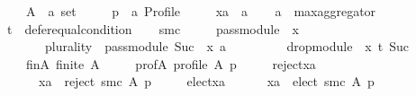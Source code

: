 \begin{isabellebody}
\isanewline
\ \ \ \ A\ {\isacharcolon}{\kern0pt}{\isacharcolon}{\kern0pt}\ {\isachardoublequoteopen}{\isacharprime}{\kern0pt}a\ set{\isachardoublequoteclose}\ \isanewline
\ \ \ \ p\ {\isacharcolon}{\kern0pt}{\isacharcolon}{\kern0pt}\ {\isachardoublequoteopen}{\isacharprime}{\kern0pt}a\ Profile{\isachardoublequoteclose}\ \isanewline
\ \ \ \ xa\ {\isacharcolon}{\kern0pt}{\isacharcolon}{\kern0pt}\ {\isachardoublequoteopen}{\isacharprime}{\kern0pt}a{\isachardoublequoteclose}\isanewline
\ \ \isamarkupfalse%
\ {\isacharquery}{\kern0pt}a\ {\isacharequal}{\kern0pt}\ {\isachardoublequoteopen}max{\isacharunderscore}{\kern0pt}aggregator{\isachardoublequoteclose}\isanewline
\ \ \isamarkupfalse%
\ {\isacharquery}{\kern0pt}t\ {\isacharequal}{\kern0pt}\ {\isachardoublequoteopen}defer{\isacharunderscore}{\kern0pt}equal{\isacharunderscore}{\kern0pt}condition{\isachardoublequoteclose}\isanewline
\ \ \isamarkupfalse%
\ {\isacharquery}{\kern0pt}smc\ {\isacharequal}{\kern0pt}\isanewline
\ \ \ \ {\isachardoublequoteopen}pass{\isacharunderscore}{\kern0pt}module\ {}\ x\ {\isasymtriangleright}\isanewline
\ \ \ \ \ \ \ {\isacharparenleft}{\kern0pt}{\isacharparenleft}{\kern0pt}plurality{\isasymdown}{\isacharparenright}{\kern0pt}\ {\isasymtriangleright}\ pass{\isacharunderscore}{\kern0pt}module\ {\isacharparenleft}{\kern0pt}Suc\ {}{\isacharparenright}{\kern0pt}\ x{\isacharparenright}{\kern0pt}\ {\isasymparallel}\isactrlsub {\isacharquery}{\kern0pt}a\isanewline
\ \ \ \ \ \ \ \ \ drop{\isacharunderscore}{\kern0pt}module\ {}\ x\ {\isasymcirclearrowleft}\isactrlsub {\isacharquery}{\kern0pt}t\ {\isacharparenleft}{\kern0pt}Suc\ {}{\isacharparenright}{\kern0pt}{\isachardoublequoteclose}\isanewline
\ \ \isamarkupfalse%
\isanewline
\ \ \ \ fin{\isacharunderscore}{\kern0pt}A{\isacharcolon}{\kern0pt}\ {\isachardoublequoteopen}finite\ A{\isachardoublequoteclose}\ \isanewline
\ \ \ \ prof{\isacharunderscore}{\kern0pt}A{\isacharcolon}{\kern0pt}\ {\isachardoublequoteopen}profile\ A\ p{\isachardoublequoteclose}\ \isanewline
\ \ \ \ reject{\isacharunderscore}{\kern0pt}xa{\isacharcolon}{\kern0pt}\isanewline
\ \ \ \ \ \ {\isachardoublequoteopen}xa\ {\isasymin}\ reject\ {\isacharparenleft}{\kern0pt}{\isacharquery}{\kern0pt}smc{\isacharparenright}{\kern0pt}\ A\ p{\isachardoublequoteclose}\ \isanewline
\ \ \ \ elect{\isacharunderscore}{\kern0pt}xa{\isacharcolon}{\kern0pt}\isanewline
\ \ \ \ \ \ {\isachardoublequoteopen}xa\ {\isasymin}\ elect\ {\isacharparenleft}{\kern0pt}{\isacharquery}{\kern0pt}smc{\isacharparenright}{\kern0pt}\ A\ p{\isachardoublequoteclose}\isanewline

\end{isabellebody}
